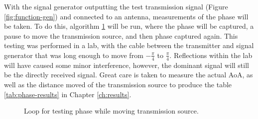 \documentclass[class=report,11pt,crop=false]{standalone}
\begin{document}
With the signal generator outputting the test transmission signal (Figure \ref{fig:function-gen}) and connected to an antenna, measurements of the phase will be taken. To do this, algorithm \ref{alg:loop} will be run, where the phase will be captured, a pause to move the transmission source, and then phase captured again. This testing was performed in a lab, with the cable between the transmitter and signal generator that was long enough to move from $-\frac{\pi}{4}$ to $\frac{\pi}{4}$. Reflections within the lab will have caused some minor interference, however, the dominant signal will still be the directly received signal. Great care is taken to measure the actual \gls{AoA}, as well as the distance moved of the transmission source to produce the table \ref{tab:phase-results} in Chapter \ref{ch:results}.

\begin{figure}[h]
  \vspace{0.2cm}
  \centering
  \captionsetup{type=figure}
  \begin{minipage}[5cm]{.7\linewidth}
    \begin{algorithm}[H]
      \caption{Loop for testing phase while moving transmission source.\label{alg:loop}}
      \DontPrintSemicolon
      \SetAlgoLined
      \BlankLine
    \vspace{0.2cm}
    \end{algorithm}
  \end{minipage}
\end{figure}
\end{document}
